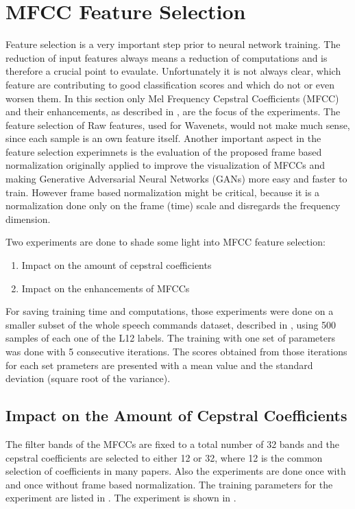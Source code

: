
\section{MFCC Feature Selection}\label{sec:exp_fs}
\thesisStateNotReady
Feature selection is a very important step prior to neural network training.
The reduction of input features always means a reduction of computations and is therefore a crucial point to evaulate.
Unfortunately it is not always clear, which feature are contributing to good classification scores and which do not or even worsen them.
In this section only Mel Frequency Cepstral Coefficients (MFCC) and their enhancements, as described in , are the focus of the experiments.
The feature selection of Raw features, used for Wavenets, would not make much sense, since each sample is an own feature itself.
Another important aspect in the feature selection experimnets is the evaluation of the proposed frame based normalization  originally applied to improve the visualization of MFCCs and making Generative Adversarial Neural Networks (GANs) more easy and faster to train.
However frame based normalization might be critical, because it is a normalization done only on the frame (time) scale and disregards the frequency dimension.

Two experiments are done to shade some light into MFCC feature selection:
\begin{enumerate}
    \item Impact on the amount of cepstral coefficients
    \item Impact on the enhancements of MFCCs
\end{enumerate}
For saving training time and computations, those experiments were done on a smaller subset of the whole speech commands dataset, described in , using 500 samples of each one of the L12 labels.
The training with one set of parameters was done with 5 consecutive iterations.
The scores obtained from those iterations for each set prameters are presented with a mean value and the standard deviation (square root of the variance).



\subsection{Impact on the Amount of Cepstral Coefficients}
The filter bands of the MFCCs are fixed to a total number of 32 bands and the cepstral coefficients are selected to either 12 or 32, where 12 is the common selection of coefficients in many papers.
Also the experiments are done once with and once without frame based normalization.
The training parameters for the experiment are listed in .
The experiment is shown in .
%

